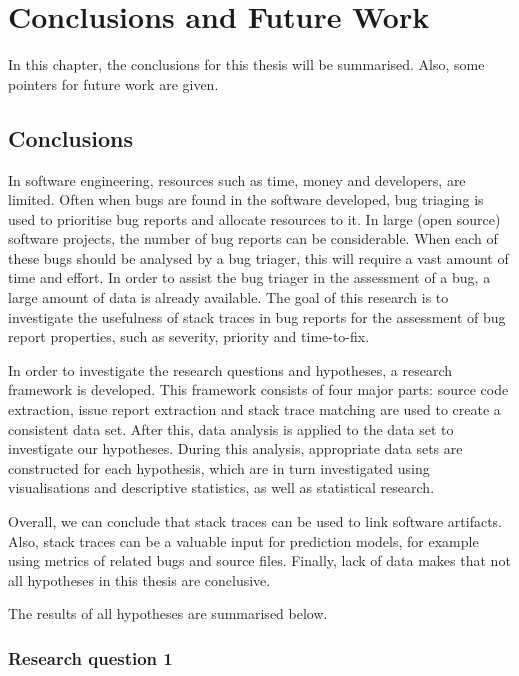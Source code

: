 
\chapter{Conclusions and Future Work} %
\label{cha:conclusions_and_future_work}
In this chapter, the conclusions for this thesis will be summarised. Also, some pointers for future work are given.

\section{Conclusions} %
In software engineering, resources such as time, money and developers, are limited. Often when bugs are found in the software developed, bug triaging is used to prioritise bug reports and allocate resources to it. In large (open source) software projects, the number of bug reports can be considerable. When each of these bugs should be analysed by a bug triager, this will require a vast amount of time and effort. In order to assist the bug triager in the assessment of a bug, a large amount of data is already available. The goal of this research is to investigate the usefulness of stack traces in bug reports for the assessment of bug report properties, such as severity, priority and time-to-fix.

In order to investigate the research questions and hypotheses, a research framework is developed. This framework consists of four major parts: source code extraction, issue report extraction and stack trace matching are used to create a consistent data set. After this, data analysis is applied to the data set to investigate our hypotheses. During this analysis, appropriate data sets are constructed for each hypothesis, which are in turn investigated using visualisations and descriptive statistics, as well as statistical research.

Overall, we can conclude that stack traces can be used to link software artifacts. Also, stack traces can be a valuable input for prediction models, for example using metrics of related bugs and source files. Finally, lack of data makes that not all hypotheses in this thesis are conclusive. 

The results of all hypotheses are summarised below.

\subsection{Research question 1} %


